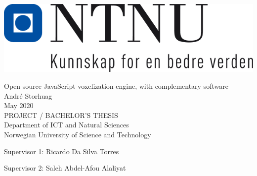  
\thispagestyle{empty}
\includegraphics[scale=0.4]{fig/logo.png}
\mbox{}\\[6pc]
\begin{center}
\Huge{Open source JavaScript voxelization engine, with complementary software}\\[2pc]
 
\Large{André Storhuag}\\[1pc]
\large{May 2020}\\[2pc]
 
PROJECT / BACHELOR'S THESIS\\
Department of ICT and Natural Sciences\\
Norwegian University of Science and Technology
\end{center}
\vfill
 
\noindent Supervisor 1: Ricardo Da Silva Torres

\noindent Supervisor 2: Saleh Abdel-Afou Alaliyat
 